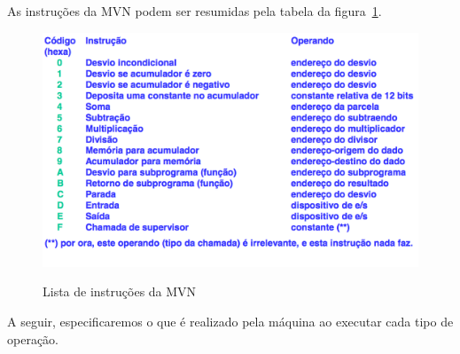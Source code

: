As instruções da MVN podem ser resumidas pela tabela da figura~\ref{fig:instrucoes-mvn}.

\begin{figure}[ht]
	\centering
	\caption{Lista de instruções da MVN}
	\includegraphics[width=\textwidth]{images/instrucoes-mvn.png}
	\label{fig:instrucoes-mvn}
\end{figure}

A seguir, especificaremos o que é realizado pela máquina ao executar cada tipo de operação.		

